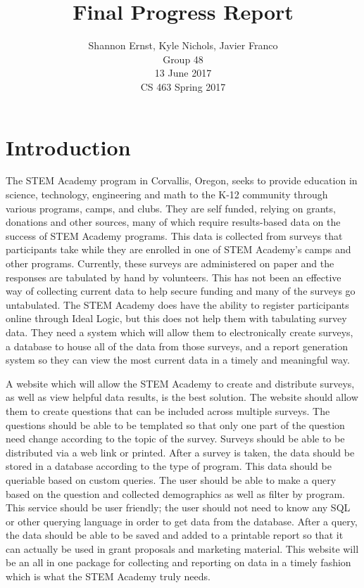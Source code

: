 \documentclass[letterpaper,10pt,serif,draftclsnofoot,onecolumn,compsoc,titlepage]{IEEEtran}
\title{Final Progress Report}
\author{Shannon Ernst, Kyle Nichols, Javier Franco\\ Group 48 \\ 13 June 2017 \\ CS 463 Spring 2017}
\begin{document}
\maketitle
\begin{abstract}

\end{abstract}
\newpage
\tableofcontents
\newpage

\section{Introduction}
The STEM Academy program in Corvallis, Oregon, seeks to provide education in science, technology, engineering and math to the K-12 community through various programs, camps, and clubs.
They are self funded, relying on grants, donations and other sources, many of which require results-based data on the success of STEM Academy programs.
This data is collected from surveys that participants take while they are enrolled in one of STEM Academy's camps and other programs.
Currently, these surveys are administered on paper and the responses are tabulated by hand by volunteers.
This has not been an effective way of collecting current data to help secure funding and many of the surveys go untabulated.
The STEM Academy does have the ability to register participants online through Ideal Logic, but this does not help them with tabulating survey data.
They need a system which will allow them to electronically create surveys, a database to house all of the data from those surveys, and a report generation system so they can view the most current data in a timely and meaningful way.

A website which will allow the STEM Academy to create and distribute surveys, as well as view helpful data results, is the best solution.
The website should allow them to create questions that can be included across multiple surveys.
The questions should be able to be templated so that only one part of the question need change according to the topic of the survey.
Surveys should be able to be distributed via a web link or printed.
After a survey is taken, the data should be stored in a database according to the type of program.
This data should be queriable based on custom queries.
The user should be able to make a query based on the question and collected demographics as well as filter by program.
This service should be user friendly; the user should not need to know any SQL or other querying language in order to get data from the database.
After a query, the data should be able to be saved and added to a printable report so that it can actually be used in grant proposals and marketing material.
This website will be an all in one package for collecting and reporting on data in a timely fashion which is what the STEM Academy truly needs.
\end{document}
